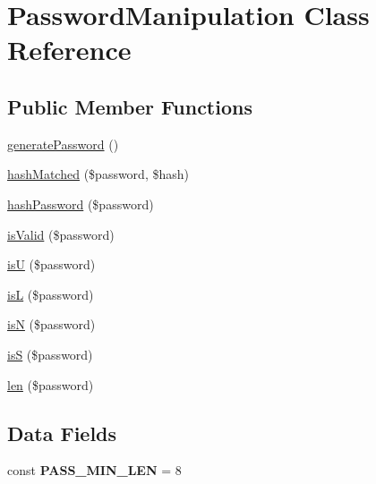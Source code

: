 \hypertarget{class_zest_1_1_common_1_1_password_manipulation}{}\section{Password\+Manipulation Class Reference}
\label{class_zest_1_1_common_1_1_password_manipulation}
\subsection*{Public Member Functions}
\begin{DoxyCompactItemize}
\item 
\mbox{\hyperlink{class_zest_1_1_common_1_1_password_manipulation_aeb9142f7e2ac30897a6442f43b1c8472}{generate\+Password}} ()
\item 
\mbox{\hyperlink{class_zest_1_1_common_1_1_password_manipulation_a5e2e186ce399d87770d450e2657b0ca7}{hash\+Matched}} (\$password, \$hash)
\item 
\mbox{\hyperlink{class_zest_1_1_common_1_1_password_manipulation_a6a754638ee4a060aee99964f5a8d015d}{hash\+Password}} (\$password)
\item 
\mbox{\hyperlink{class_zest_1_1_common_1_1_password_manipulation_ad425450552b15b347e37950309954338}{is\+Valid}} (\$password)
\item 
\mbox{\hyperlink{class_zest_1_1_common_1_1_password_manipulation_adfaa93e8974d5b4a0c211792c90c26d9}{isU}} (\$password)
\item 
\mbox{\hyperlink{class_zest_1_1_common_1_1_password_manipulation_af01cb5778dc27623b6edd63033139a30}{isL}} (\$password)
\item 
\mbox{\hyperlink{class_zest_1_1_common_1_1_password_manipulation_a51b61dc4d9471a4bad70f55c63ec656c}{isN}} (\$password)
\item 
\mbox{\hyperlink{class_zest_1_1_common_1_1_password_manipulation_a68ce7a511fed2a4a564c121a6c32a4cd}{isS}} (\$password)
\item 
\mbox{\hyperlink{class_zest_1_1_common_1_1_password_manipulation_a3fac569849d2f482ec1fbe9efbefb731}{len}} (\$password)
\end{DoxyCompactItemize}
\subsection*{Data Fields}
\begin{DoxyCompactItemize}
\item 
\mbox{\label{class_zest_1_1_common_1_1_password_manipulation_aa771c49b8f2cdb8a56927153063284cd}} 
const {\bfseries P\+A\+S\+S\+\_\+\+M\+I\+N\+\_\+\+L\+EN} = 8
\end{DoxyCompactItemize}


